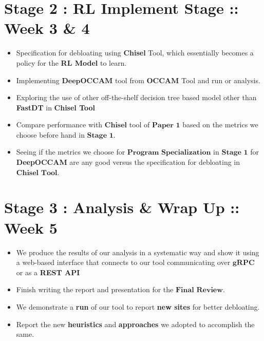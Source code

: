 \documentclass{article} %
\begin{document}
\section*{Stage 2 : RL Implement Stage :: Week 3 \& 4} 
\begin{itemize}
	\item Specification for debloating using \textbf{Chisel} Tool, which essentially becomes a policy for the \textbf{RL Model} to learn. 
    \item Implementing $\textbf{DeepOCCAM}$ tool from $\textbf{OCCAM}$ Tool and run or analysis. 
    \item Exploring the use of other off-the-shelf decision tree based model other than \textbf{FastDT} in \textbf{Chisel Tool} 
    \item Compare performance with $\textbf{Chisel}$ tool of $\textbf{Paper 1}$ based on the metrics we choose before hand in $\textbf{Stage 1}$. 
    \item Seeing if the metrics we choose for $\textbf{Program Specialization}$ in $\textbf{Stage 1}$ for \textbf{DeepOCCAM} are any good versus the specification for debloating in $\textbf{Chisel Tool}$.  
\end{itemize}

\section*{Stage 3 : Analysis \& Wrap Up :: Week 5}
\begin{itemize}
    \item We produce the results of our analysis in a systematic way and show it using a web-based interface that connects to our tool communicating over $\textbf{gRPC}$ or as a \textbf{REST API}
    \item Finish writing the report and presentation for the $\textbf{Final Review}$. 
    \item We demonstrate a \textbf{run} of our tool to report \textbf{new sites} for better debloating. 
    \item Report the new \textbf{heuristics} and \textbf{approaches} we adopted to accomplish the same. 
\end{itemize}
\end{document}
